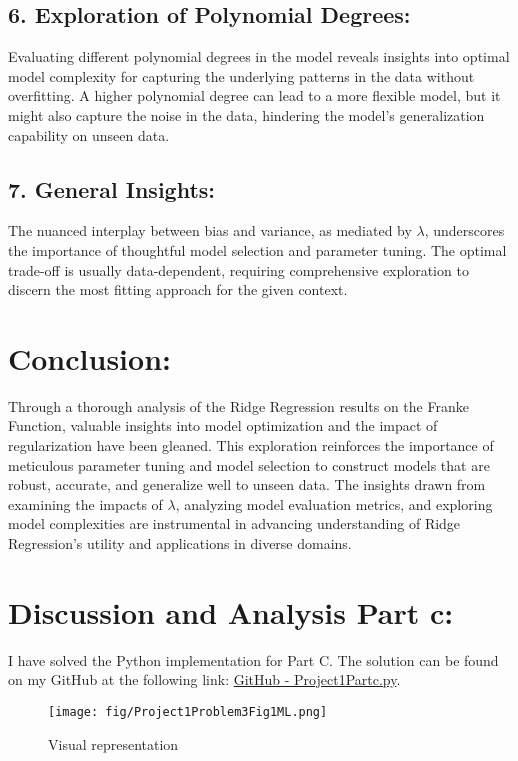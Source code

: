\documentclass{article}
\begin{document}
\subsection*{6. Exploration of Polynomial Degrees:}
Evaluating different polynomial degrees in the model reveals insights into optimal model complexity for capturing the underlying patterns in the data without overfitting. A higher polynomial degree can lead to a more flexible model, but it might also capture the noise in the data, hindering the model's generalization capability on unseen data.

\subsection*{7. General Insights:}
The nuanced interplay between bias and variance, as mediated by $\lambda$, underscores the importance of thoughtful model selection and parameter tuning. The optimal trade-off is usually data-dependent, requiring comprehensive exploration to discern the most fitting approach for the given context.

\section*{Conclusion:}
Through a thorough analysis of the Ridge Regression results on the Franke Function, valuable insights into model optimization and the impact of regularization have been gleaned. This exploration reinforces the importance of meticulous parameter tuning and model selection to construct models that are robust, accurate, and generalize well to unseen data. The insights drawn from examining the impacts of $\lambda$, analyzing model evaluation metrics, and exploring model complexities are instrumental in advancing understanding of Ridge Regression's utility and applications in diverse domains.



\section*{Discussion and Analysis Part c:}

I have solved the Python implementation for Part C. The solution can be found on my GitHub at the following link: \href{https://github.com/SheikAbdullahi/MachineLearning/blob/main/Project1/Project1Partc.py}{GitHub - Project1Partc.py}.


\begin{figure}[htbp]
    \centering
    \texttt{[image: fig/Project1Problem3Fig1ML.png]}
    \caption{Visual representation}
    \label{fig:python-code}
\end{figure}
\end{document}
